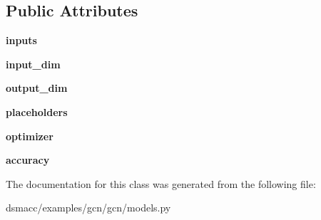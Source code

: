 \subsection*{Public Attributes}
\begin{DoxyCompactItemize}
\item 
\mbox{\label{classgcn_1_1models_1_1GCN_a29714ec1b278daedb9efae786cc088c4}} 
{\bfseries inputs}
\item 
\mbox{\label{classgcn_1_1models_1_1GCN_aaa466b8c310f94c98ba92be84edd4414}} 
{\bfseries input\+\_\+dim}
\item 
\mbox{\label{classgcn_1_1models_1_1GCN_a2ae3717e7a2b9b20888c8df7b3cb7c8e}} 
{\bfseries output\+\_\+dim}
\item 
\mbox{\label{classgcn_1_1models_1_1GCN_affe28b80385aa4144c880de3ef0b6ea2}} 
{\bfseries placeholders}
\item 
\mbox{\label{classgcn_1_1models_1_1GCN_a9d6599506554673fd18707615e2a30d5}} 
{\bfseries optimizer}
\item 
\mbox{\label{classgcn_1_1models_1_1GCN_af61fc0663e287eee8814ed0d0a8a89c6}} 
{\bfseries accuracy}
\end{DoxyCompactItemize}


The documentation for this class was generated from the following file\+:\begin{DoxyCompactItemize}
\item 
dsmacc/examples/gcn/gcn/models.\+py\end{DoxyCompactItemize}
